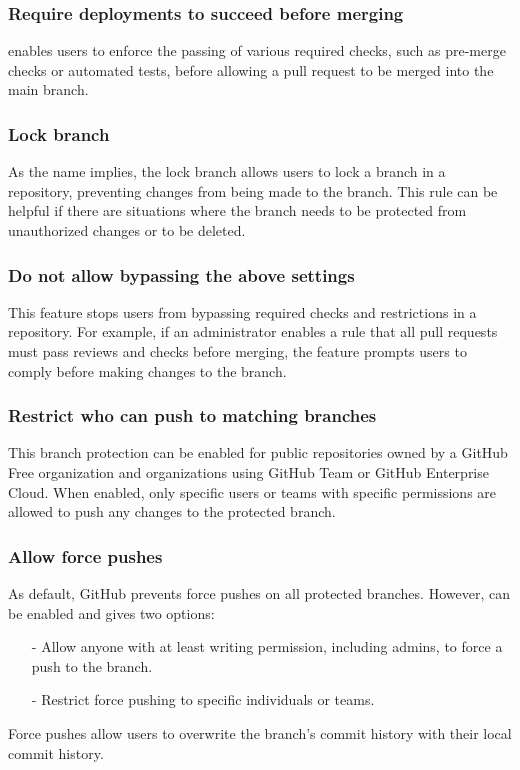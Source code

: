 \subsubsection{Require deployments to succeed before merging}
 enables users to enforce the passing of various required checks, such as pre-merge checks or automated tests, before allowing a pull request to be merged into the main branch.

\subsubsection{Lock branch}
As the name implies, the lock branch allows users to lock a branch in a repository, preventing changes from being made to the branch. This rule can be helpful if there are situations where the branch needs to be protected from unauthorized changes or to be deleted. 

\subsubsection{Do not allow bypassing the above settings}
This feature stops users from bypassing required checks and restrictions in a repository. For example, if an administrator enables a rule that all pull requests must pass reviews and checks before merging, the feature prompts users to comply before making changes to the branch.

\subsubsection{Restrict who can push to matching branches}
This branch protection can be enabled for public repositories owned by a GitHub Free organization and organizations using GitHub Team or GitHub Enterprise Cloud. When enabled, only specific users or teams with specific permissions are allowed to push any changes to the protected branch. 
\newpage
\subsubsection{Allow force pushes}
As default, GitHub prevents force pushes on all protected branches. However,  can be enabled and gives two options:
\begin{itemize}
    \item [-] Allow anyone with at least writing permission, including admins, to force a push to the branch.
    \item [-] Restrict force pushing to specific individuals or teams. 
\end{itemize}
Force pushes allow users to overwrite the branch's commit history with their local commit history. 
